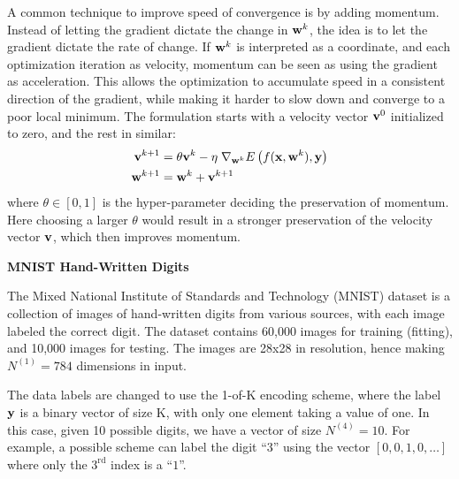 A common technique to improve speed of convergence 
is by adding momentum.
Instead of letting the gradient dictate the change in $\mathbf{w}^k$,
the idea is to let the gradient dictate the rate of change.
If $\mathbf{w}^k$ is interpreted as a coordinate,
and each optimization iteration as velocity,
momentum can be seen as using the gradient as acceleration. 
This allows the optimization to accumulate speed in 
a consistent direction of the gradient, 
while making it harder to slow down and 
converge to a poor local minimum.
The formulation starts with a velocity vector $\mathbf{v}^0$
initialized to zero, and the rest in similar:
%
\begin{equation}
\begin{aligned}
	\mathbf{v}^{k+1} &= \theta \mathbf{v}^{k} - \eta \; \nabla_{\mathbf{w}^k} 
				E\left(f(\mathbf{x},\mathbf{w}^k),\mathbf{y}\right) \\
	\mathbf{w}^{k+1} &= \mathbf{w}^{k} + \mathbf{v}^{k+1}
\end{aligned}
\end{equation}
%
where $\theta \in [0,1]$ is the hyper-parameter 
deciding the preservation of momentum.
Here choosing a larger $\theta$ would result in a stronger 
preservation of the velocity vector $\mathbf{v}$,
which then improves momentum.

\pagebreak
\noindent
\large
{\bf MNIST Hand-Written Digits}
\normalsize

The Mixed National Institute of Standards and Technology
(MNIST) dataset is a collection of images of hand-written digits
from various sources,
with each image labeled the correct digit.
The dataset contains 60,000 images for training (fitting),
and 10,000 images for testing.
The images are 28x28 in resolution,
hence making $N^{(1)} = 784$ dimensions in input.

The data labels are changed to use the 1-of-K encoding scheme,
where the label $\mathbf{y}$ is a binary vector of size K,
with only one element taking a value of one.
In this case, given 10 possible digits,
we have a vector of size $N^{(4)} = 10$.
For example, a possible scheme can label the digit ``$3$'' 
using the vector $[0,0,1,0,\ldots]$ where 
only the $3^\text{rd}$ index is a ``$1$''.


